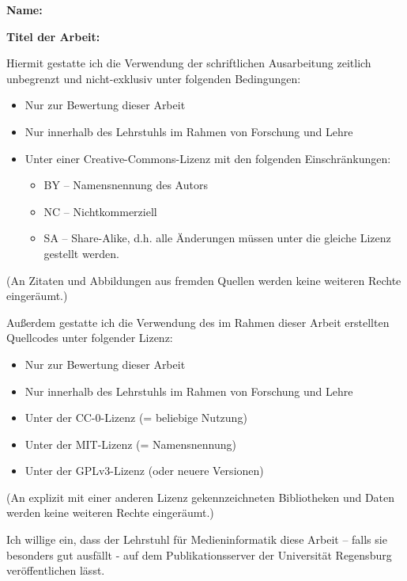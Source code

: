
\textbf{Name:} \getAuthor

\textbf{Titel der Arbeit:} \textit{\getTitle}

Hiermit gestatte ich die Verwendung der schriftlichen Ausarbeitung zeitlich unbegrenzt und nicht-exklusiv unter folgenden Bedingungen:

\begin{itemize}
    \item[\checkboxEmpty] Nur zur Bewertung dieser Arbeit
    \item[\checkboxEmpty] Nur innerhalb des Lehrstuhls im Rahmen von Forschung und Lehre
    \item[\checkboxChecked] Unter einer Creative-Commons-Lizenz mit den folgenden Einschränkungen:
    \begin{itemize}
        \item[\checkboxChecked] BY – Namensnennung des Autors
        \item[\checkboxEmpty] NC – Nichtkommerziell
        \item[\checkboxEmpty] SA – Share-Alike, d.h. alle Änderungen müssen unter die gleiche Lizenz gestellt werden.
    \end{itemize}
\end{itemize}
{\scriptsize(An Zitaten und Abbildungen aus fremden Quellen werden keine weiteren Rechte eingeräumt.)}

Außerdem gestatte ich die Verwendung des im Rahmen dieser Arbeit erstellten Quellcodes unter folgender Lizenz:

\begin{itemize}
    \item[\checkboxEmpty] Nur zur Bewertung dieser Arbeit
    \item[\checkboxEmpty] Nur innerhalb des Lehrstuhls im Rahmen von Forschung und Lehre
    \item[\checkboxEmpty] Unter der CC-0-Lizenz (= beliebige Nutzung)
    \item[\checkboxChecked] Unter der MIT-Lizenz (= Namensnennung)
    \item[\checkboxEmpty] Unter der GPLv3-Lizenz (oder neuere Versionen)
\end{itemize}

{\scriptsize(An explizit mit einer anderen Lizenz gekennzeichneten Bibliotheken und Daten werden keine weiteren Rechte eingeräumt.)}

\noindent
Ich willige ein, dass der Lehrstuhl  für Medieninformatik diese Arbeit – falls sie besonders gut ausfällt - auf dem Publikationsserver der Universität Regensburg veröffentlichen lässt.

